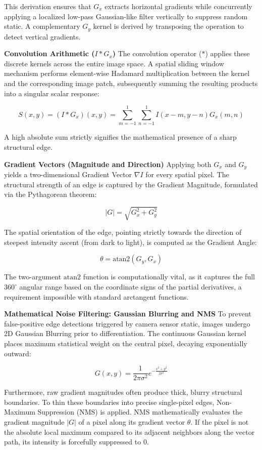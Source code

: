 This derivation ensures that \(G_x\) extracts horizontal gradients while
concurrently applying a localized low-pass Gaussian-like filter
vertically to suppress random static. A complementary \(G_y\) kernel is
derived by transposing the operation to detect vertical gradients.

\textbf{Convolution Arithmetic (\(I * G_x\))} The convolution operator
(\(*\)) applies these discrete kernels across the entire image space. A
spatial sliding window mechanism performs element-wise Hadamard
multiplication between the kernel and the corresponding image patch,
subsequently summing the resulting products into a singular scalar
response:

\[S(x, y) = (I * G_x)(x, y) = \sum_{m=-1}^{1} \sum_{n=-1}^{1} I(x-m, y-n) G_x(m, n)\]

A high absolute sum strictly signifies the mathematical presence of a
sharp structural edge.

\textbf{Gradient Vectors (Magnitude and Direction)} Applying both
\(G_x\) and \(G_y\) yields a two-dimensional Gradient Vector
\(\nabla I\) for every spatial pixel. The structural strength of an edge
is captured by the Gradient Magnitude, formulated via the Pythagorean
theorem:

\[|G| = \sqrt{G_x^2 + G_y^2}\]

The spatial orientation of the edge, pointing strictly towards the
direction of steepest intensity ascent (from dark to light), is computed
as the Gradient Angle:

\[\theta = \text{atan2}(G_y, G_x)\]

The two-argument \(\text{atan2}\) function is computationally vital, as
it captures the full \(360^\circ\) angular range based on the coordinate
signs of the partial derivatives, a requirement impossible with standard
arctangent functions.

\textbf{Mathematical Noise Filtering: Gaussian Blurring and NMS} To
prevent false-positive edge detections triggered by camera sensor
static, images undergo 2D Gaussian Blurring prior to differentiation.
The continuous Gaussian kernel places maximum statistical weight on the
central pixel, decaying exponentially outward:

\[G(x, y) = \frac{1}{2\pi\sigma^2} e^{-\frac{x^2+y^2}{2\sigma^2}}\]

Furthermore, raw gradient magnitudes often produce thick, blurry
structural boundaries. To thin these boundaries into precise
single-pixel edges, Non-Maximum Suppression (NMS) is applied. NMS
mathematically evaluates the gradient magnitude \(|G|\) of a pixel along
its gradient vector \(\theta\). If the pixel is not the absolute local
maximum compared to its adjacent neighbors along the vector path, its
intensity is forcefully suppressed to \(0\).

